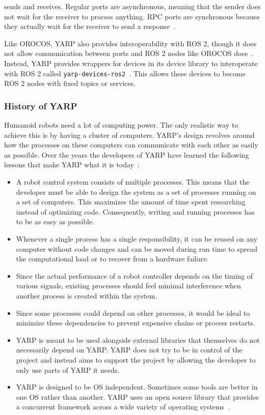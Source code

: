 \documentclass[a4paper]{book}
\begin{document}
sends and receives. Regular ports are asynchronous, meaning that the sender does
not wait for the receiver to process anything. RPC ports are synchronous because
they actually wait for the receiver to send a response~\cite{yarp_docs_rpc}.
\par
Like OROCOS, YARP also provides interoperability with ROS 2, though it does not
allow communication between ports and ROS 2 nodes like OROCOS
does~\cite{orocos_rtt_ros2}. Instead, YARP provides wrappers for devices in its
device library to interoperate with ROS 2 called
\texttt{yarp-devices-ros2}~\cite{yarp_devices_ros2, yarp_docs_nws}. This allows
these devices to become ROS 2 nodes with fixed topics or services.
\par
\subsubsection{History of YARP}
Humanoid robots need a lot of computing power. The only realistic way to achieve
this is by having a cluster of computers. YARP's design revolves around how the
processes on these computers can communicate with each other as easily as
possible. Over the years the developers of YARP have learned the following
lessons that make YARP what it is today~\cite{metta2006yarp}:
\begin{itemize}
	\item A robot control system consists of multiple processes. This means that
        the developer must be able to design the system as a set of processes
        running on a set of computers. This maximizes the amount of time spent
        researching instead of optimizing code. Consequently, writing and
        running processes has to be as easy as possible.
	\item Whenever a single process has a single responsibility, it can be
        reused on any computer without code changes and can be moved during run
        time to spread the computational load or to recover from a hardware
        failure.
	\item Since the actual performance of a robot controller depends on the
        timing of various signals, existing processes should feel minimal
        interference when another process is created within the system.
	\item Since some processes could depend on other processes, it would be
        ideal to minimize these dependencies to prevent expensive chains or
        process restarts.
	\item YARP is meant to be used alongside external libraries that themselves
        do not necessarily depend on YARP. YARP does not try to be in control of
        the project and instead aims to support the project by allowing the
        developer to only use parts of YARP it needs.
    \item YARP is designed to be OS independent. Sometimes some tools are better
        in one OS rather than another. YARP uses an open source library that
        provides a concurrent framework across a wide variety of operating
        systems~\cite{metta2006yarp}.
\end{itemize}
\end{document}
